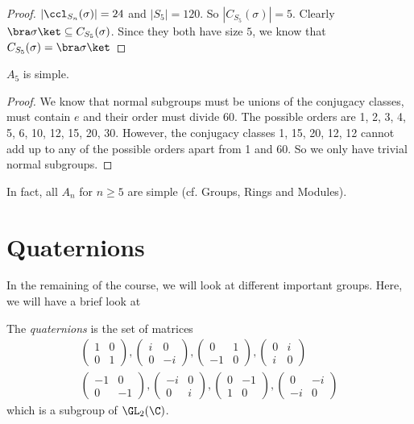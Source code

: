 \documentclass[a4paper]{article}
\begin{document}
\begin{proof}
  $|\ccl_{S_n}(\sigma)| = 24$ and $|S_5| = 120$. So $|C_{S_5}(\sigma)| = 5$. Clearly $\bra \sigma \ket \subseteq C_{S_5}(\sigma)$. Since they both have size $5$, we know that $C_{S_5}(\sigma) = \bra \sigma\ket$
\end{proof}

\begin{thm}
  $A_5$ is simple.
\end{thm}

\begin{proof}
  We know that normal subgroups must be unions of the conjugacy classes, must contain $e$ and their order must divide 60. The possible orders are 1, 2, 3, 4, 5, 6, 10, 12, 15, 20, 30. However, the conjugacy classes 1, 15, 20, 12, 12 cannot add up to any of the possible orders apart from 1 and 60. So we only have trivial normal subgroups.
\end{proof}
In fact, all $A_n$ for $n\geq 5$ are simple (cf. Groups, Rings and Modules).

\section{Quaternions}
In the remaining of the course, we will look at different important groups. Here, we will have a brief look at
\begin{defi}[Quaternions]
  The \emph{quaternions} is the set of matrices
  \begin{gather*}
    \begin{pmatrix}
      1&0\\0&1
    \end{pmatrix},
    \begin{pmatrix}
      i & 0\\0&-i
    \end{pmatrix},
    \begin{pmatrix}
      0&1\\-1&0
    \end{pmatrix},
    \begin{pmatrix}
      0&i\\i&0
    \end{pmatrix}
    \\
    \begin{pmatrix}
      -1&0\\0&-1
    \end{pmatrix},
    \begin{pmatrix}
      -i & 0\\0&i
    \end{pmatrix},
    \begin{pmatrix}
      0&-1\\1&0
    \end{pmatrix},
    \begin{pmatrix}
      0&-i\\-i&0
    \end{pmatrix}
  \end{gather*}
  which is a subgroup of $\GL_2(\C)$.
\end{defi}
\end{document}
